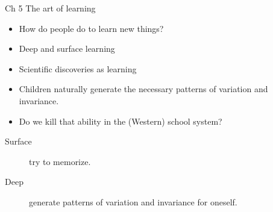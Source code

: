 \begin{frame}
  \begin{block}{Ch 5 The art of learning}
    \begin{itemize}
      \item How do people do to learn new things?
      \item Deep and surface learning
      \item Scientific discoveries as learning
    \end{itemize}
  \end{block}

  \pause

  \begin{example}
    \begin{itemize}
      \item Children naturally generate the necessary patterns of variation and 
        invariance.
    \end{itemize}
  \end{example}

  \pause

  \begin{question}
    \begin{itemize}
      \item Do we kill that ability in the (Western) school system?
    \end{itemize}
  \end{question}
\end{frame}

\begin{frame}
  \begin{remark}
  \end{remark}

  \begin{example}
    \begin{description}
      \item[Surface] try to memorize.
      \item[Deep] generate patterns of variation and invariance for oneself.
    \end{description}
  \end{example}
\end{frame}

